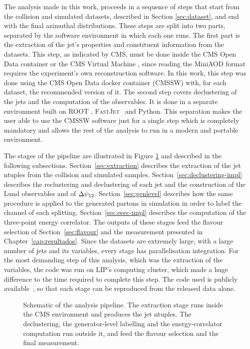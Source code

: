 The analysis made in this work, proceeds in a sequence of steps that start from the 
collision and simulated datasets, described in Section \ref{sec:dataset}, and end
with the final azimuthal distributions. These steps are split into two parts,
separated by the software environment in which each one runs. The first part is the 
extraction of the jet's properties and constituent information from the datasets. 
This step, as indicated by CMS, must be done inside  the CMS Open Data container or the CMS Virtual Machine
, since reading the MiniAOD format requires the experiment's own reconstruction software. In this
work, this step was done using the CMS Open Data docker container (\textsc{CMSSW}) with, for each dataset, the recommended
version of it. The second step covers declustering of the jets and the computation of the observables.
It is done in a separate environment built on ROOT \cite{Brun:1997pa}, \textsc{FastJet}~\cite{Cacciari_2012} and Python.
This separation makes the user able to use the \textsc{CMSSW} software just for a single step which is
completely mandatory and allows the rest of the analysis to run in a modern and
portable environment.

The stages of the pipeline are illustrated in Figure \ref{fig:pipeline} and described in the following
subsections. Section~\ref{sec:extraction} describes
the extraction of the jet ntuples from the collision and simulated samples.
Section~\ref{sec:declustering-impl} describes the reclustering and declustering of
each jet and the construction of the Lund observables and of $\Delta\psi_{12}$.
Section~\ref{sec:genlevel} describes how the same procedure is applied to the
generated partons in simulation in order to label the channel of each splitting.
Section~\ref{sec:eeec-impl} describes the computation of the three-point energy
correlator. The outputs of these stages feed the flavour selection of
Section~\ref{sec:flavour} and the measurement presented in
Chapter~\ref{cap:resultados}. Since the datasets are extremely large, with a large
number of jets and its variables, every stage has parallelisation integration. For the
most demanding step of this analysis, which was the extraction of the variables, the code was 
run on LIP's computing cluster, which made a huge difference to the time required to
complete this step. The code used is publicly available~\cite{Mendonca:CMSJetSubstructure}, so that each stage can be
reproduced from the released data alone.

\begin{figure}[htbp]
  \centering
  \resizebox{0.75\textwidth}{!}{}
  \caption{Schematic of the analysis pipeline. The extraction stage runs inside
  the CMS environment and produces the jet ntuples. The declustering, the
  generator-level labelling and the energy-correlator computation run outside it,
  and feed the flavour selection and the final measurement.}
  \label{fig:pipeline}
\end{figure}

